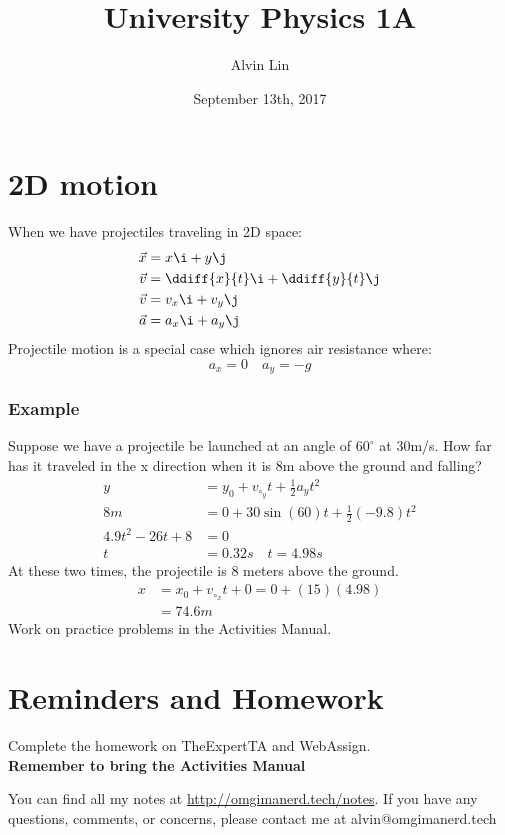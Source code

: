 \documentclass[letterpaper, 12pt]{math}
\title{University Physics 1A}
\author{Alvin Lin}
\date{September 13th, 2017}
\begin{document}
\maketitle

\section*{2D motion}
When we have projectiles traveling in 2D space:
\begin{align*}
  \vec{x} &= x\i+y\j \\
  \vec{v} &= \ddiff{x}{t}\i+\ddiff{y}{t}\j \\
  \vec{v} &= v_x\i+v_y\j \\
  \vec{a} &= a_x\i+a_y\j
\end{align*}
Projectile motion is a special case which ignores air resistance where:
\[ a_x = 0 \quad a_y = -g \]

\subsubsection*{Example}
Suppose we have a projectile be launched at an angle of \( 60^{\circ} \) at
30m/s. How far has it traveled in the x direction when it is 8m above the
ground and falling?
\begin{align*}
  y &= y_0+v_{\circ_y}t+\frac{1}{2}a_yt^2 \\
  8m &= 0+30\sin(60)t+\frac{1}{2}(-9.8)t^2 \\
  4.9t^2-26t+8 &= 0 \\
  t &= 0.32s \quad t = 4.98s
\end{align*}
At these two times, the projectile is 8 meters above the ground.
\begin{align*}
  x &= x_0+v_{\circ_x}t+0 = 0+(15)(4.98) \\
  &= 74.6m
\end{align*}
Work on practice problems in the Activities Manual.

\section*{Reminders and Homework}
Complete the homework on TheExpertTA and WebAssign. \\
\textbf{Remember to bring the Activities Manual}

\begin{center}
  You can find all my notes at \url{http://omgimanerd.tech/notes}. If you have
  any questions, comments, or concerns, please contact me at
  alvin@omgimanerd.tech
\end{center}
\end{document}
